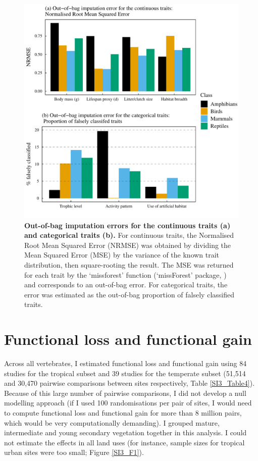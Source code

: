 \begin{figure}[h!]
\centering
\includegraphics[scale=0.8]{Supporting/Chapter3/Figures/SI_imputation_errors}
\caption[Out-of-bag imputation errors for the continuous traits (a) and categorical traits (b)]{\textbf{Out-of-bag imputation errors for the continuous traits (a) and categorical traits (b).} For continuous traits, the Normalised Root Mean Squared Error (NRMSE) was obtained by dividing the Mean Squared Error (MSE) by the variance of the known trait distribution, then square-rooting the result. The MSE was returned for each trait by the `missforest' function (`missForest' package, \cite{Stekhoven2012, Stekhoven2016}) and corresponds to an out-of-bag error. For categorical traits, the error was estimated as the out-of-bag proportion of falsely classified traits.}
\label{SI3_F8}
\end{figure}

\newpage

\section{Functional loss and functional gain}

Across all vertebrates, I estimated functional loss and functional gain using 84 studies for the tropical subset and 39 studies for the temperate subset (51,514 and 30,470 pairwise comparisons between sites respectively, Table \ref{SI3_Table4}). Because of this large number of pairwise comparisons, I did not develop a null modelling approach (if I used 100 randomisations per pair of sites, I would need to compute functional loss and functional gain for more than 8 million pairs, which would be very computationally demanding). I grouped mature, intermediate and young secondary vegetation together in this analysis. I could not estimate the effects in all land uses (for instance, sample sizes for tropical urban sites were too small; Figure \ref{SI3_F1}).

